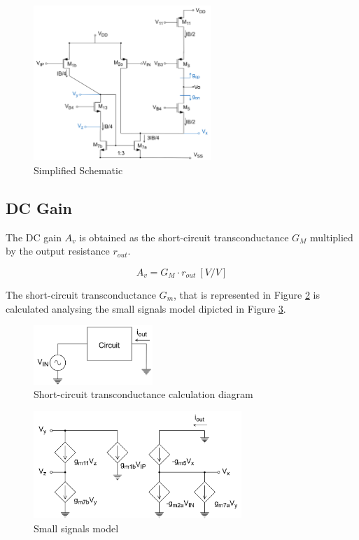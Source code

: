 \begin{figure}[H]
    \centering
    \includegraphics[width=0.6\textwidth]{Images/simplified_sch.png}
    \caption{Simplified Schematic}
    \label{fig:simplified_schematic}
\end{figure}

\subsection {DC Gain}

The DC gain $A_v$ is obtained as the short-circuit transconductance $G_M$ multiplied by the output resistance $r_{out}$.

$$A_v = G_M \cdot r_{out}\ [V/V]$$

The short-circuit transconductance $G_m$, that is represented in Figure \ref{fig:cc_transconductance} is calculated analysing the small signals model dipicted in Figure \ref{fig:small_signals}.

\begin{figure}[H]
    \centering
    \includegraphics[width=0.4\textwidth]{Images/cc_transconductance.png}
    \caption{Short-circuit transconductance calculation diagram}
    \label{fig:cc_transconductance}
\end{figure}

\begin{figure}[H]
    \centering
    \includegraphics[width=0.7\textwidth]{Images/small_signals.png}
    \caption{Small signals model}
    \label{fig:small_signals}
\end{figure}

